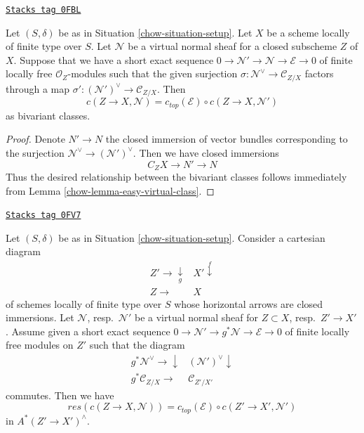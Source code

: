 \begin{lemma}
\label{chow-lemma-gysin-decompose}
\href{https://stacks.math.columbia.edu/tag/0FBL}{\texttt{Stacks tag 0FBL}}

Let $(S, \delta)$ be as in Situation \ref{chow-situation-setup}. Let $X$ be a scheme
locally of finite type over $S$. Let $\mathcal{N}$ be a virtual normal
sheaf for a closed subscheme $Z$ of $X$. Suppose that we have a short
exact sequence $0 \to \mathcal{N}' \to \mathcal{N} \to \mathcal{E} \to 0$
of finite locally free $\mathcal{O}_Z$-modules such that the given surjection
$\sigma : \mathcal{N}^\vee \to \mathcal{C}_{Z/X}$ factors through a map
$\sigma' : (\mathcal{N}')^\vee \to \mathcal{C}_{Z/X}$.
Then
$$
c(Z \to X, \mathcal{N}) = c_{top}(\mathcal{E}) \circ c(Z \to X, \mathcal{N}')
$$
as bivariant classes.
\end{lemma}

\begin{proof}

Denote $N' \to N$ the closed immersion of vector bundles corresponding
to the surjection $\mathcal{N}^\vee \to (\mathcal{N}')^\vee$. Then we
have closed immersions
$$
C_ZX \to N' \to N
$$
Thus the desired relationship between the bivariant classes follows
immediately from Lemma \ref{chow-lemma-easy-virtual-class}.
\end{proof}

\begin{lemma}
\label{chow-lemma-gysin-excess}
\href{https://stacks.math.columbia.edu/tag/0FV7}{\texttt{Stacks tag 0FV7}}

Let $(S, \delta)$ be as in Situation \ref{chow-situation-setup}. Consider
a cartesian diagram
$$
\begin{array}{cc}Z' \longrightarrow\underset{g}{\downarrow} & X' \overset{f}{\downarrow} \\ Z \longrightarrow & X\end{array}
$$
of schemes locally of finite type over $S$ whose horizontal arrows
are closed immersions. Let $\mathcal{N}$, resp.\ $\mathcal{N}'$
be a virtual normal sheaf for $Z \subset X$, resp.\ $Z' \to X'$.
Assume given a short exact sequence
$0 \to \mathcal{N}' \to g^*\mathcal{N} \to \mathcal{E} \to 0$
of finite locally free modules on $Z'$ such that the diagram
$$
\begin{array}{cc}g^*\mathcal{N}^\vee \longrightarrow\downarrow & (\mathcal{N}')^\vee \downarrow \\ g^*\mathcal{C}_{Z/X} \longrightarrow & \mathcal{C}_{Z'/X'}\end{array}
$$
commutes. Then we have
$$
res(c(Z \to X, \mathcal{N})) =
c_{top}(\mathcal{E}) \circ c(Z' \to X', \mathcal{N}')
$$
in $A^*(Z' \to X')^\wedge$.
\end{lemma}

